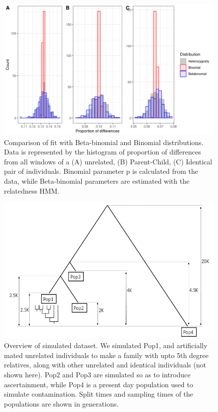 \documentclass[12pt, letterpaper]{article}
\begin{document}
\begin{figure}[h!]
    \includegraphics[width=18cm]{supplementary_info/plots/binom.png}
    \centering
    \caption{Comparison of fit with Beta-binomial and Binomial distributions. Data is represented by the histogram of proportion of differences from all windows of a (A) unrelated, (B) Parent-Child, (C) Identical pair of individuals. Binomial parameter p is calculated from the data, while Beta-binomial parameters are estimated with the relatedness HMM.}
    \label{figS1:binom}
    
\end{figure}


\begin{figure}[h!]
    \includegraphics[width=18cm]{plots/inkscape_finalImg/pedigree.png}
    \centering
    \caption{Overview of simulated dataset. We simulated Pop1, and artificially mated unrelated individuals to make a family with upto 5th degree relatives, along with other unrelated and identical individuals (not shown here). Pop2 and Pop3 are simulated so as to introduce ascertainment, while Pop4 is a present day population used to simulate contamination. Split times and sampling times of the populations are shown in generations.}
    \label{figS10:pedigree}
    
\end{figure}
\end{document}

